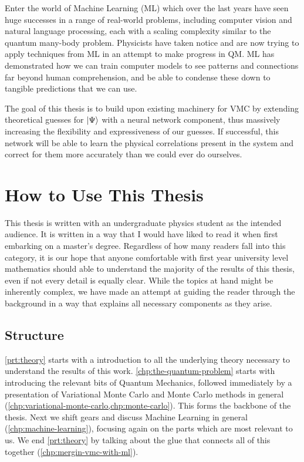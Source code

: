 \documentclass[Thesis.tex]{subfiles}
\begin{document}
Enter the world of Machine Learning (ML) which over the last years have seen
huge successes in a range of real-world problems, including computer vision and
natural language processing, each with a scaling complexity similar to
the quantum many-body problem. Physicists have taken notice and are now trying
to apply techniques from ML in an attempt to make progress in QM. ML has
demonstrated how we can train computer models to see patterns and connections
far beyond human comprehension, and be able to condense these down to tangible
predictions that we can use.

The goal of this thesis is to build upon existing machinery for VMC by extending
theoretical guesses for $| \Psi \rangle$ with a neural network component, thus massively
increasing the flexibility and expressiveness of our guesses. If successful, this
network will be able to learn the physical correlations present in the system
and correct for them more accurately than we could ever do ourselves.



\section*{How to Use This Thesis}

This thesis is written with an undergraduate physics student as the intended
audience. It is written in a way that I would have liked to read it when first
embarking on a master's degree. Regardless of how many readers fall into this
category, it is our hope that anyone comfortable with first year university
level mathematics should able to understand the majority of the results of this
thesis, even if not every detail is equally clear. While the topics at hand might be
inherently complex, we have made an attempt at guiding the reader through the
background in a way that explains all necessary components as they arise.


\subsection*{Structure}
\cref{prt:theory} starts with a introduction to all the underlying theory
necessary to understand the results of this work. \cref{chp:the-quantum-problem}
starts with introducing the relevant bits of Quantum Mechanics, followed
immediately by a presentation of Variational Monte Carlo and Monte Carlo methods
in general (\cref{chp:variational-monte-carlo,chp:monte-carlo}). This forms the
backbone of the thesis. Next we shift gears and discuss Machine Learning in
general (\cref{chp:machine-learning}), focusing again on the parts which are
most relevant to us. We end \cref{prt:theory} by talking about the glue that
connects all of this together (\cref{chp:mergin-vmc-with-ml}).
\end{document}
